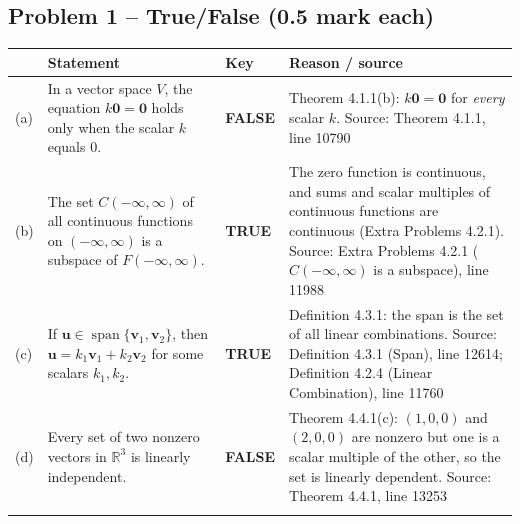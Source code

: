 \documentclass[11pt,a4paper]{article}
\newcommand{\Src}[1]{{\footnotesize\color{black!65}Source: #1}}
\begin{document}
\subsection*{Problem 1 -- True/False (0.5 mark each)}
\begin{tabularx}{\linewidth}{@{}l >{\raggedright\arraybackslash}X l >{\raggedright\arraybackslash}X@{}}\toprule & Statement & Key & Reason / source\\\midrule
(a) & In a vector space $V$, the equation $k\mathbf{0}=\mathbf{0}$ holds only when the scalar $k$ equals $0$. & \textbf{FALSE} & Theorem 4.1.1(b): $k\mathbf{0}=\mathbf{0}$ for \emph{every} scalar $k$. \Src{Theorem 4.1.1, line 10790}\\\addlinespace
(b) & The set $C(-\infty,\infty)$ of all continuous functions on $(-\infty,\infty)$ is a subspace of $F(-\infty,\infty)$. & \textbf{TRUE} & The zero function is continuous, and sums and scalar multiples of continuous functions are continuous (Extra Problems 4.2.1). \Src{Extra Problems 4.2.1 ($C(-\infty,\infty)$ is a subspace), line 11988}\\\addlinespace
(c) & If $\mathbf{u}\in\operatorname{span}\{\mathbf{v}_1,\mathbf{v}_2\}$, then $\mathbf{u}=k_1\mathbf{v}_1+k_2\mathbf{v}_2$ for some scalars $k_1,k_2$. & \textbf{TRUE} & Definition 4.3.1: the span is the set of all linear combinations. \Src{Definition 4.3.1 (Span), line 12614; Definition 4.2.4 (Linear Combination), line 11760}\\\addlinespace
(d) & Every set of two nonzero vectors in $\mathbb{R}^3$ is linearly independent. & \textbf{FALSE} & Theorem 4.4.1(c): $(1,0,0)$ and $(2,0,0)$ are nonzero but one is a scalar multiple of the other, so the set is linearly dependent. \Src{Theorem 4.4.1, line 13253}\\\addlinespace
\bottomrule\end{tabularx}
\end{document}
